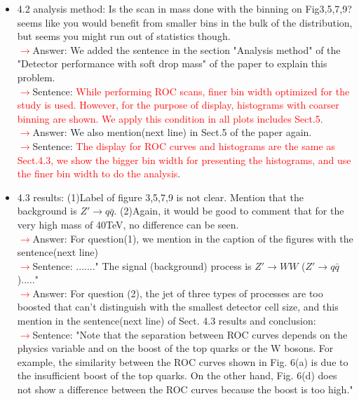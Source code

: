 \documentclass[final,1p,11pt]{elsarticle}
\begin{document}
\begin{itemize}
\item 4.2 analysis method: Is the scan in mass done with the binning on Fig3,5,7,9? seems like you would benefit from smaller bins in the bulk of the distribution, but seems you might run out of statistics though.\\
 \textcolor{red}{$\rightarrow$}Answer: We added the sentence in the section "Analysis method" of the "Detector performance with soft drop mass" of the paper to explain this problem.\\
 \textcolor{red}{$\rightarrow$}Sentence: \textcolor{red}{While performing ROC scans, finer bin width optimized for the study is used. However, for the purpose of display, histograms with coarser binning are shown. We apply this condition in all plots includes Sect.5.}\\
 \textcolor{red}{$\rightarrow$}Answer: We also mention(next line) in Sect.5 of the paper again.\\
 \textcolor{red}{$\rightarrow$}Sentence: \textcolor{red}{The display for ROC curves and histograms are the same as Sect.4.3, we show the bigger bin width for presenting the histograms, and use the finer bin width to do the analysis}.
\item 4.3 results: (1)Label of figure 3,5,7,9 is not clear. Mention that the background is $Z'\rightarrow q\bar{q}$. (2)Again, it would be good to comment that for the very high mass of 40TeV, no difference can be seen.\\
 \textcolor{red}{$\rightarrow$}Answer:  For question(1), we mention in the caption of the figures with the sentence(next line)\\
 \textcolor{red}{$\rightarrow$}Sentence:  ......." The signal (background) process is $Z' \rightarrow WW$ ($Z'\rightarrow q\bar{q}$)....."\\
 \textcolor{red}{$\rightarrow$}Answer:  For question (2), the jet of three types of processes are too boosted that can't distinguish with the smallest detector cell size, and this mention in the sentence(next line) of Sect. 4.3 results and conclusion:\\
 \textcolor{red}{$\rightarrow$}Sentence: "Note that the separation between ROC curves depends on the physics variable and on the boost of the top quarks or the W bosons. For example, the similarity between the ROC curves shown in Fig. 6(a) is due to the insufficient boost of the top quarks. On the other hand, Fig. 6(d) does not show a difference between the ROC curves because the boost is too high."\\

\end{itemize}
\end{document}
